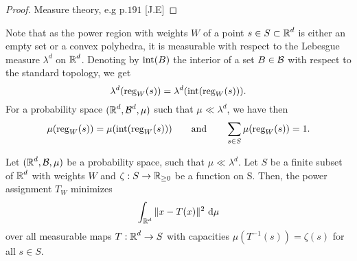 \documentclass[
     12pt,         %
     a4paper,      %
     BCOR=10mm,     %
     DIV=14,        %
     ]{scrreprt}
\begin{document}
    \begin{proof}[Proof]
    Measure theory, e.g p.$191$ [J.E]
    \end{proof}
    \begin{rem*} \label{rem::measurabilty}
        Note that as the power region with weights $W$ of a point $s\in S\subset \operatorname{\mathbb{R}}^d$ is either an empty set or a convex polyhedra, it is measurable with respect to the Lebesgue measure $\lambda^d$ on $\operatorname{\mathbb{R}}^d$.
        Denoting by $\operatorname{int}(B)$ the interior of a set $B \in \operatorname{\mathcal{B}}$ with respect to the standard topology, we get  
        \[\lambda^d(\operatorname{reg}_W(s)) = \lambda^d({\operatorname{int}(\operatorname{reg}_W(s)})).\]
        For a probability space $(\operatorname{\mathbb{R}}^d,\operatorname{\mathcal{B}}^d,\mu)$ such that $\mu \ll \lambda^d$, we have then
        \[\mu(\operatorname{reg}_W(s)) = \mu(\operatorname{int}({\operatorname{reg}_W(s)})) \quad \quad \text{and} \quad \quad \sum_{s\in S} \mu(\operatorname{reg}_W(s))=1.\]

        
    \end{rem*}
    \begin{lem} \label{lemma::1step}
        Let $(\operatorname{\mathbb{R}}^d,\operatorname{\mathcal{B}},\mu)$ be a probability space, such that $\mu \ll \lambda^d$.  Let $S$ be a finite subset of $\operatorname{\mathbb{R}}^d$ with weights $W$ and $\zeta: S \to \operatorname{\mathbb{R}}_{\ge 0}$ be a function on S.
        Then, the power assignment $T_W $ minimizes 
        \[\int_{\operatorname{\mathbb{R}}^d} \|x-T(x) \|^2 \ {\operatorname{{\mathrm{d}}}} \mu \]
        over all measurable maps $T : \operatorname{\mathbb{R}}^d \to S $ with capacities $\mu(T^{-1} (s)) = \zeta(s)  $ for all $s\in S$.
    \end{lem}
\end{document}
